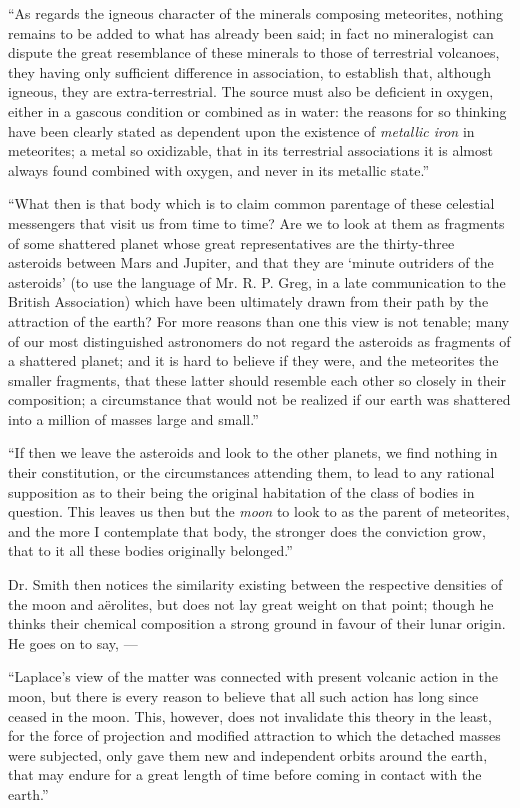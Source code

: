 \documentclass[a4paper, 12pt, oneside]{article}
\begin{document}
``As regards the igneous character of the minerals composing meteorites, nothing remains to be added to what has already been said; in fact no mineralogist can dispute the great resemblance of these minerals to those of terrestrial volcanoes, they having only sufficient difference in association, to establish that, although igneous, they are extra-terrestrial. The source must also be deficient in oxygen, either in a gascous condition or combined as in water: the reasons for so thinking have been clearly stated as dependent upon the existence of \emph{metallic iron} in meteorites; a metal so oxidizable, that in its terrestrial associations it is almost always found combined with oxygen, and never in its metallic state.''

``What then is that body which is to claim common parentage of these celestial messengers that visit us from time to time? Are we to look at them as fragments of some shattered planet whose great representatives are the thirty-three asteroids between Mars and Jupiter, and that they are `minute outriders of the asteroids' (to use the language of Mr. R. P. Greg, in a late communication to the British Association) which have been ultimately drawn from their path by the attraction of the earth? For more reasons than one this view is not tenable; many of our most distinguished astronomers do not regard the asteroids as fragments of a shattered planet; and it is hard to believe if they were, and the meteorites the smaller fragments, that these latter should resemble each other so closely in their composition; a circumstance that would not be realized if our earth was shattered into a million of masses large and small.''

``If then we leave the asteroids and look to the other planets, we find nothing in their constitution, or the circumstances attending them, to lead to any rational supposition as to their being the original habitation of the class of bodies in question. This leaves us then but the \emph{moon} to look to as the parent of meteorites, and the more I contemplate that body, the stronger does the conviction grow, that to it all these bodies originally belonged.''

Dr. Smith then notices the similarity existing between the respective densities of the moon and aërolites, but does not lay great weight on that point; though he thinks their chemical composition a strong ground in favour of their lunar origin. He goes on to say, ---

``Laplace's view of the matter was connected with present volcanic action in the moon, but there is every reason to believe that all such action has long since ceased in the moon. This, however, does not invalidate this theory in the least, for the force of projection and modified attraction to which the detached masses were subjected, only gave them new and independent orbits around the earth, that may endure for a great length of time before coming in contact with the earth.''
\end{document}
